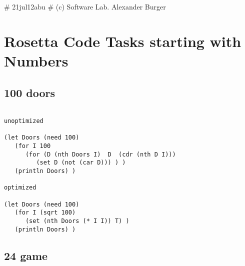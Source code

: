 # 21jul12abu
# (c) Software Lab. Alexander Burger

\chapter{Rosetta Code Tasks starting with Numbers}
\label{rosettacode-numbers}

\section*{100 doors}

\begin{verbatim}

unoptimized

(let Doors (need 100)
   (for I 100
      (for (D (nth Doors I)  D  (cdr (nth D I)))
         (set D (not (car D))) ) )
   (println Doors) )

optimized

(let Doors (need 100)
   (for I (sqrt 100)
      (set (nth Doors (* I I)) T) )
   (println Doors) )

\end{verbatim}

\section*{24 game}


